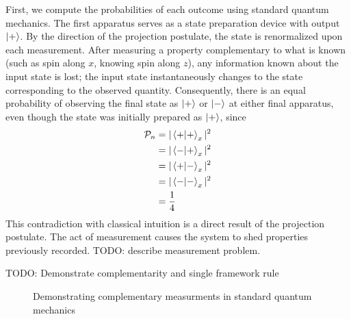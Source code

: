 First, we compute the probabilities of each outcome using standard quantum mechanics. The first apparatus serves as a state preparation device with output $\ket{+}$. By the direction of the projection postulate, the state is renormalized upon each measurement. After measuring a property complementary to what is known (such as spin along $x$, knowing spin along $z$), any information known about the input state is lost; the input state instantaneously changes to the state corresponding to the observed quantity. Consequently, there is an equal probability of observing the final state as $\ket{+}$ or $\ket{-}$ at either final apparatus, even though the state was initially prepared as $\ket{+}$, since
\begin{align*}
    \mathcal{P}_n &= |\braket{+|+}_x|^2 \\
                  &= |\braket{-|+}_x|^2 \\
                  &= |\braket{+|-}_x|^2 \\
                  &= |\braket{-|-}_x|^2 \\
                  &= \frac{1}{4}
\end{align*}
This contradiction with classical intuition is a direct result of the projection postulate. The act of measurement causes the system to shed properties previously recorded. TODO: describe measurement problem.

TODO: Demonstrate complementarity and single framework rule

\begin{figure}
\centering\CaptionFontSize
{}
\caption[Insert an abbreviated caption here to show in the List of Figures]
{Demonstrating complementary measurments in standard quantum mechanics}
\label{Figure:Intro:FigureExampleC}
\end{figure}

